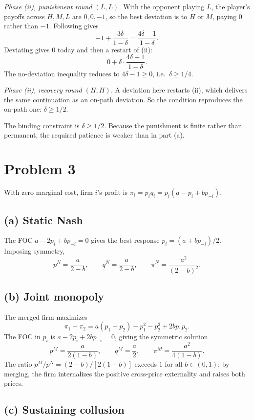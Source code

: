 \documentclass[11pt]{article}
\begin{document}
\smallskip
\emph{Phase (ii), punishment round $(L,L)$.} With the opponent playing $L$, the player's payoffs across $H,M,L$ are $0,0,-1$, so the best deviation is to $H$ or $M$, paying $0$ rather than $-1$. Following gives
\[
-1+\frac{3\delta}{1-\delta}=\frac{4\delta-1}{1-\delta}.
\]
Deviating gives $0$ today and then a restart of (ii):
\[
0+\delta\cdot\frac{4\delta-1}{1-\delta}.
\]
The no-deviation inequality reduces to $4\delta-1 \ge 0$, i.e.\ $\delta \ge 1/4$.

\smallskip
\emph{Phase (ii), recovery round $(H,H)$.} A deviation here restarts (ii), which delivers the same continuation as an on-path deviation. So the condition reproduces the on-path one: $\delta \ge 1/2$.

\smallskip
The binding constraint is $\delta \ge 1/2$. Because the punishment is finite rather than permanent, the required patience is weaker than in part (a).

\section*{Problem 3}

With zero marginal cost, firm $i$'s profit is $\pi_i = p_i q_i = p_i(a - p_i + b p_{-i})$.

\subsection*{(a) Static Nash}

The FOC $a - 2p_i + b p_{-i} = 0$ gives the best response $p_i = (a + bp_{-i})/2$. Imposing symmetry,
\[
p^N = \frac{a}{2-b},\qquad q^N = \frac{a}{2-b},\qquad \pi^N = \frac{a^2}{(2-b)^2}.
\]

\subsection*{(b) Joint monopoly}

The merged firm maximizes
\[
\pi_1 + \pi_2 = a(p_1 + p_2) - p_1^2 - p_2^2 + 2b p_1 p_2.
\]
The FOC in $p_i$ is $a - 2p_i + 2b p_{-i} = 0$, giving the symmetric solution
\[
p^M = \frac{a}{2(1-b)},\qquad q^M = \frac{a}{2},\qquad \pi^M = \frac{a^2}{4(1-b)}.
\]
The ratio $p^M/p^N = (2-b)/[2(1-b)]$ exceeds $1$ for all $b\in(0,1)$: by merging, the firm internalizes the positive cross-price externality and raises both prices.

\subsection*{(c) Sustaining collusion}
\end{document}
